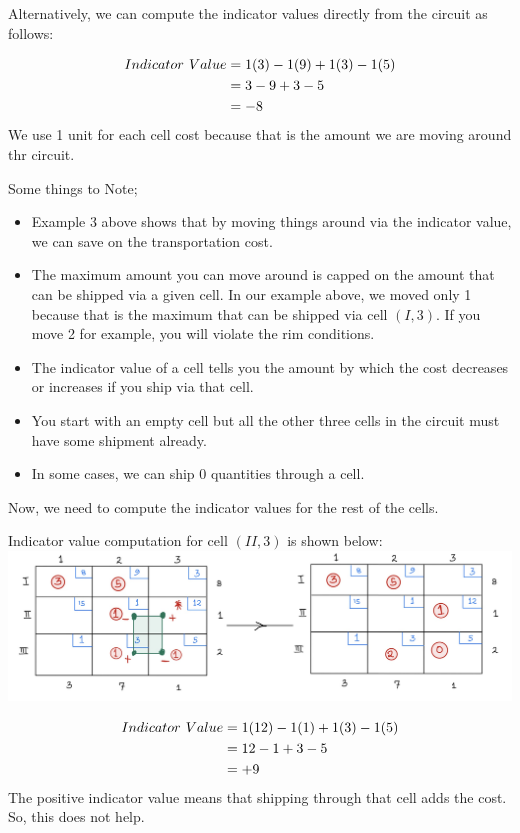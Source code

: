 \documentclass[
  letterpaper,
  DIV=11,
  numbers=noendperiod]{scrreprt}
\providecommand{\tightlist}{%
  \setlength{\itemsep}{0pt}\setlength{\parskip}{0pt}}\usepackage{longtable,booktabs,array}
\begin{document}
Alternatively, we can compute the indicator values directly from the
circuit as follows:

\[
\begin{aligned}
Indicator \hspace{.05in}Value&= 1(3)-1(9)+1(3)-1(5)\\
&=3-9+3-5\\
&=-8
\end{aligned}
\] We use 1 unit for each cell cost because that is the amount we are
moving around thr circuit.

Some things to Note;

\begin{itemize}
\tightlist
\item
  Example 3 above shows that by moving things around via the indicator
  value, we can save on the transportation cost.
\item
  The maximum amount you can move around is capped on the amount that
  can be shipped via a given cell. In our example above, we moved only 1
  because that is the maximum that can be shipped via cell \((I,3)\). If
  you move 2 for example, you will violate the rim conditions.
\item
  The indicator value of a cell tells you the amount by which the cost
  decreases or increases if you ship via that cell.
\item
  You start with an empty cell but all the other three cells in the
  circuit must have some shipment already.
\item
  In some cases, we can ship 0 quantities through a cell.
\end{itemize}

Now, we need to compute the indicator values for the rest of the cells.

Indicator value computation for cell \((II,3)\) is shown below:
\includegraphics{images/n.jpeg}

\[
\begin{aligned}
Indicator \hspace{.05in}Value&= 1(12)-1(1)+1(3)-1(5)\\
&=12-1+3-5\\
&=+9
\end{aligned}
\] The positive indicator value means that shipping through that cell
adds the cost. So, this does not help.
\end{document}
